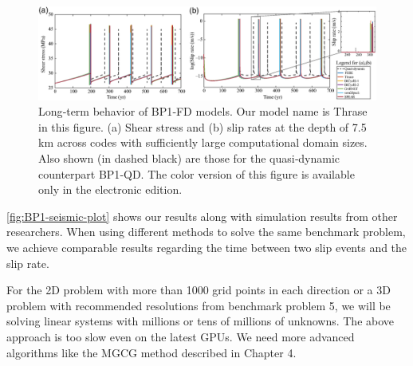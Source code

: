 \begin{figure}
    \centering
    \includegraphics[width=\linewidth]{figures/BP1-seismic-plot.png}
    \caption{Long‐term behavior of BP1‐FD models. Our model name is Thrase in this figure. (a) Shear stress and (b) slip rates at the depth of 7.5 km across codes with sufficiently large computational domain sizes. Also shown (in dashed black) are those for the quasi‐dynamic counterpart BP1‐QD. The color version of this figure is available only in the electronic edition. \citep{erickson2023incorporating}}
    \label{fig:BP1-seismic-plot}
\end{figure}

\autoref{fig:BP1-seismic-plot} shows our results along with simulation results from other researchers. 
When using different methods to solve the same benchmark problem, we achieve comparable results regarding the time between two slip events and the slip rate.


For the 2D problem with more than 1000 grid points in each direction or a 3D problem with recommended resolutions from benchmark problem 5, we will be solving linear systems with millions or tens of millions of unknowns.
The above approach is too slow even on the latest GPUs.
We need more advanced algorithms like the MGCG method described in Chapter 4.
